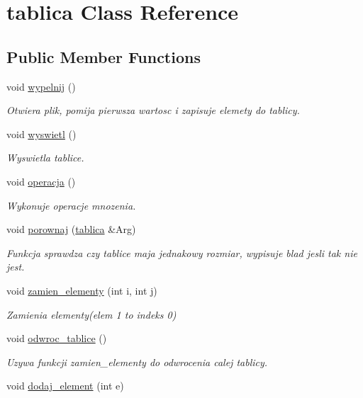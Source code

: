 \hypertarget{classtablica}{\section{tablica \-Class \-Reference}
\label{classtablica}
}
\subsection*{\-Public \-Member \-Functions}
\begin{DoxyCompactItemize}
\item 
void \hyperlink{classtablica_a2e787e39230c5bdcfa4a5b853f949021}{wypelnij} ()
\begin{DoxyCompactList}\small\item\em \-Otwiera plik, pomija pierwsza wartosc i zapisuje elemety do tablicy. \end{DoxyCompactList}\item 
void \hyperlink{classtablica_a2b47856f4150aa2386a56b4aef8f8f5a}{wyswietl} ()
\begin{DoxyCompactList}\small\item\em \-Wyswietla tablice. \end{DoxyCompactList}\item 
void \hyperlink{classtablica_a9f716d92ee6fd83cc0b86d8cadbbbeb4}{operacja} ()
\begin{DoxyCompactList}\small\item\em \-Wykonuje operacje mnozenia. \end{DoxyCompactList}\item 
void \hyperlink{classtablica_a17518aa2d52334e3abf169a2e3ed4780}{porownaj} (\hyperlink{classtablica}{tablica} \&\-Arg)
\begin{DoxyCompactList}\small\item\em \-Funkcja sprawdza czy tablice maja jednakowy rozmiar, wypisuje blad jesli tak nie jest. \end{DoxyCompactList}\item 
void \hyperlink{classtablica_a26a5a71d013d0284ff0f6b7648444a5e}{zamien\-\_\-elementy} (int i, int j)
\begin{DoxyCompactList}\small\item\em \-Zamienia elementy(elem 1 to indeks 0) \end{DoxyCompactList}\item 
void \hyperlink{classtablica_ae8fdc01e05d01a6c85e3d988c95c6cbc}{odwroc\-\_\-tablice} ()
\begin{DoxyCompactList}\small\item\em \-Uzywa funkcji zamien\-\_\-elementy do odwrocenia calej tablicy. \end{DoxyCompactList}\item 
\hypertarget{classtablica_aa1f8d3f1ac7cb8a60b305173adb1ef70}{void \hyperlink{classtablica_aa1f8d3f1ac7cb8a60b305173adb1ef70}{dodaj\-\_\-element} (int e)}\label{classtablica_aa1f8d3f1ac7cb8a60b305173adb1ef70}


\end{DoxyCompactItemize}
